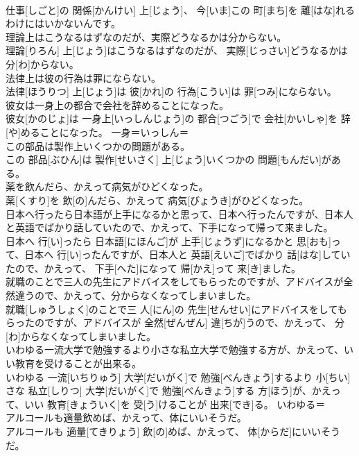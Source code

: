 \documentclass[8pt]{extreport}
\begin{document}
\begin{CJK}{UTF8}{min}
\\	仕事[しごと]の 関係[かんけい] 上[じょう]、 今[いま]この 町[まち]を 離[はな]れるわけにはいかないんです。	
\\	理論上はこうなるはずなのだが、実際どうなるかは分からない。	
\\	理論[りろん] 上[じょう]はこうなるはずなのだが、 実際[じっさい]どうなるかは 分[わ]からない。	
\\	法律上は彼の行為は罪にならない。	
\\	法律[ほうりつ] 上[じょう]は 彼[かれ]の 行為[こうい]は 罪[つみ]にならない。	
\\	彼女は一身上の都合で会社を辞めることになった。	
\\	彼女[かのじょ]は 一身上[いっしんじょう]の 都合[つごう]で 会社[かいしゃ]を 辞[や]めることになった。	一身＝いっしん＝ 
\\	この部品は製作上いくつかの問題がある。	
\\	この 部品[ぶひん]は 製作[せいさく] 上[じょう]いくつかの 問題[もんだい]がある。	
\\	薬を飲んだら、かえって病気がひどくなった。	
\\	薬[くすり]を 飲[の]んだら、かえって 病気[びょうき]がひどくなった。	
\\	日本へ行ったら日本語が上手になるかと思って、日本へ行ったんですが、日本人と英語でばかり話していたので、かえって、下手になって帰って来ました。	
\\	日本へ 行[い]ったら 日本語[にほんご]が 上手[じょうず]になるかと 思[おも]って、日本へ 行[い]ったんですが、日本人と 英語[えいご]でばかり 話[はな]していたので、かえって、 下手[へた]になって 帰[かえ]って 来[き]ました。	
\\	就職のことで三人の先生にアドバイスをしてもらったのですが、アドバイスが全然違うので、かえって、分からなくなってしまいました。	
\\	就職[しゅうしょく]のことで三 人[にん]の 先生[せんせい]にアドバイスをしてもらったのですが、アドバイスが 全然[ぜんぜん] 違[ちが]うので、かえって、 分[わ]からなくなってしまいました。	
\\	いわゆる一流大学で勉強するより小さな私立大学で勉強する方が、かえって、いい教育を受けることが出来る。	
\\	いわゆる 一流[いちりゅう] 大学[だいがく]で 勉強[べんきょう]するより 小[ちい]さな 私立[しりつ] 大学[だいがく]で 勉強[べんきょう]する 方[ほう]が、かえって、いい 教育[きょういく]を 受[う]けることが 出来[でき]る。	いわゆる＝ 
\\	アルコールも適量飲めば、かえって、体にいいそうだ。	
\\	アルコールも 適量[てきりょう] 飲[の]めば、かえって、 体[からだ]にいいそうだ。	

\end{CJK}
\end{document}
